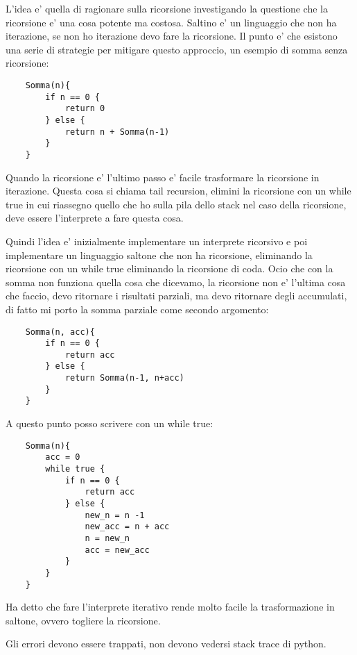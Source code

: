 L'idea e' quella di ragionare sulla ricorsione investigando la questione che la ricorsione e' una cosa potente ma costosa. Saltino e' un linguaggio che non ha iterazione, se non ho iterazione devo fare la ricorsione.
Il punto e' che esistono una serie di strategie per mitigare questo approccio, un esempio di somma senza ricorsione:

\begin{lstlisting}
    Somma(n){
        if n == 0 {
            return 0
        } else {
            return n + Somma(n-1)
        }
    }
\end{lstlisting}

Quando la ricorsione e' l'ultimo passo e' facile trasformare la ricorsione in iterazione. Questa cosa si chiama tail recursion, elimini la ricorsione con un while true in cui riassegno quello che ho sulla pila dello stack nel caso della ricorsione, deve essere l'interprete a fare questa cosa.

Quindi l'idea e' inizialmente implementare un interprete ricorsivo e poi implementare un linguaggio saltone che non ha ricorsione, eliminando la ricorsione con un while true eliminando la ricorsione di coda.
Ocio che con la somma non funziona quella cosa che dicevamo, la ricorsione non e' l'ultima cosa che faccio, devo ritornare i risultati parziali, ma devo ritornare degli accumulati, di fatto mi porto la somma parziale come secondo argomento:
\begin{lstlisting}
    Somma(n, acc){
        if n == 0 {
            return acc
        } else {
            return Somma(n-1, n+acc)
        }
    }
\end{lstlisting}

A questo punto posso scrivere con un while true:
\begin{lstlisting}
    Somma(n){
        acc = 0
        while true {
            if n == 0 {
                return acc
            } else {
                new_n = n -1
                new_acc = n + acc
                n = new_n
                acc = new_acc
            }
        }
    }
\end{lstlisting}

Ha detto che fare l'interprete iterativo rende molto facile la trasformazione in saltone, ovvero togliere la ricorsione.

Gli errori devono essere trappati, non devono vedersi stack trace di python.